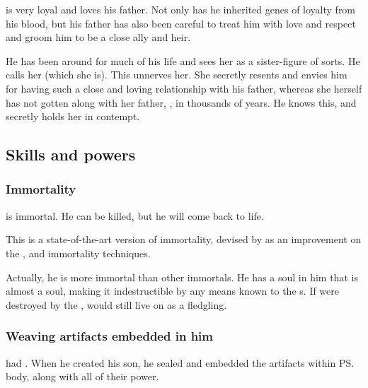 \Vizsherioch{} is very loyal and loves his father. Not only has he inherited genes of loyalty from his \bane{} blood, but his father has also been careful to treat him with love and respect and groom him to be a close ally and heir. 

He has been around  for much of his life and sees her as a sister-figure of sorts. 
He calls her  (which she is). 
This unnerves her. 
She secretly resents and envies him for having such a close and loving relationship with his father, whereas she herself has not gotten along with her father, \Ishnaruchaefir, in thousands of years. He knows this, and secretly holds her in contempt. 









\subsection{Skills and powers}





\subsubsection{Immortality}
\Vizsherioch{} is immortal. 
He can be killed, but he will come back to life. 

This is a state-of-the-art version of immortality, devised by \Secherdamon{} as an improvement on the ,  and  immortality techniques. 

Actually, he is more immortal than other immortals. 
He has a soul in him that is almost a \xsic{} soul, making it indestructible by any means known to the \Miithian s. 
If \Miith{} were destroyed by the \Voidbringer, \Vizsherioch{} would still live on as a \xs{} fledgling. 





\subsubsection{Weaving artifacts embedded in him}
\Secherdamon{} had . 
When he created his son, he sealed and embedded the artifacts within \ps{\Vizsherioch} body, along with all of their power. 

